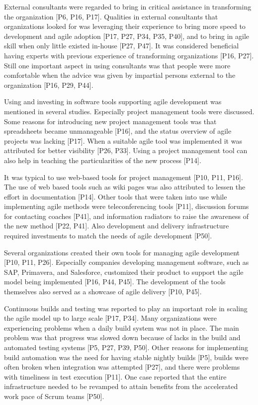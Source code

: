 External consultants were regarded to bring in critical assistance in
transforming the organization [P6, P16, P17]. Qualities in external consultants
that organizations looked for was leveraging their experience to bring more
speed to development and agile adoption [P17, P27, P34, P35, P40], and to bring
in agile skill when only little existed in-house [P27, P47]. It was considered
beneficial having experts with previous experience of transforming organizations
[P16, P27].
Still one important aspect in using consultants was that people were more
comfortable when the advice was given by impartial persons external to the
organization [P16, P29, P44].




Using and investing in software tools supporting agile development was mentioned
in several studies. Especially project management tools were discussed.
Some reasons for introducing new project management tools was that spreadsheets
became unmanageable [P16], and the status overview of agile projects was lacking
[P17]. When a suitable agile tool was implemented it was attributed for better
visibility [P26, P33]. Using a project management tool can also help in teaching
the particularities of the new process [P14].

It was typical to use web-based tools for project management [P10, P11, P16].
The use of web based tools such as wiki pages was also attributed to lessen the
effort in documentation [P14]. Other tools that were taken into use while
implementing agile methods were teleconferencing tools [P11], discussion forums
for contacting coaches [P41], and information radiators to raise the awareness
of the new method [P22, P41]. Also development and delivery infrastructure
required investments to match the needs of agile development [P50]. 

Several organizations created their own tools for managing agile development
[P10, P11, P26]. Especially companies developing management software, such as
SAP, Primavera, and Salesforce, customized their product to support the agile
model being implemented [P16, P44, P45]. The development of the tools themselves
also served as a showcase of agile delivery [P10, P45].


Continuous builds and testing was reported to play an important role in scaling
the agile model up to large scale [P17, P34]. Many organizations were
experiencing problems when a daily build system was not in place. The main
problem was that progress was slowed down because of lacks in the build and
automated testing systems [P5, P27, P39, P50].
Other reasons for implementing build automation was the need for having stable
nightly builds [P5], builds were often broken when integration was attempted
[P27], and there were problems with timeliness in test execution [P11]. One case
reported that the entire infrastructure needed to be revamped to attain benefits
from the accelerated work pace of Scrum teams [P50].

